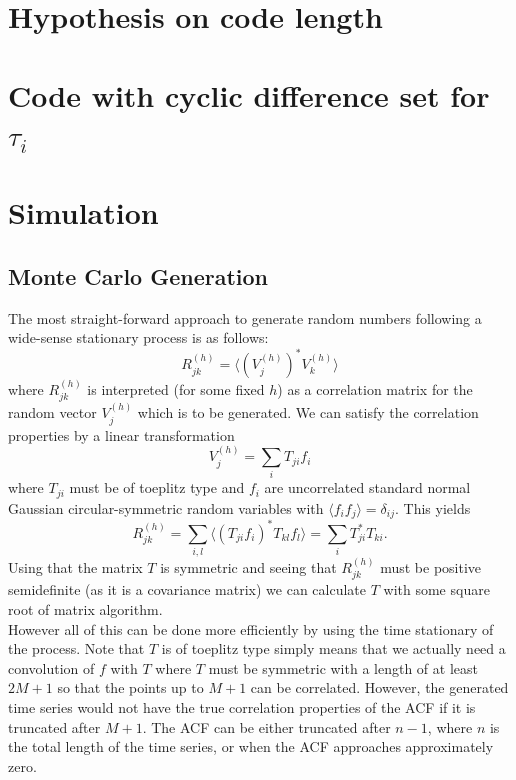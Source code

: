 \documentclass[18pt,a4paper]{extarticle}
\begin{document}
\section{Hypothesis on code length}
\section{Code with cyclic difference set for $\tau_i$}
\section{Simulation}
\subsection{Monte Carlo Generation}
The most straight-forward approach to generate random numbers following a wide-sense stationary process is as follows:
\begin{equation}
R^{(h)}_{jk} = \langle (V_{j}^{(h)})^* V_k^{(h)} \rangle
\end{equation}
where $R^{(h)}_{jk}$ is interpreted (for some fixed $h$) as a correlation matrix for the random vector $V_{j}^{(h)}$ which is to be generated.
We can satisfy the correlation properties by a linear transformation
\begin{equation}
V_j^{(h)} = \sum_{i} T_{ji}f_i
\end{equation}
where $T_{ji}$ must be of toeplitz type and $f_i$ are uncorrelated standard normal Gaussian circular-symmetric random variables with $\langle f_i f_j \rangle = \delta_{ij}$.
This yields
\begin{equation}
R^{(h)}_{jk} = \sum_{i,l} \langle (T_{ji}f_i)^* T_{kl}f_l \rangle = \sum_{i} T_{ji}^* T_{ki}.
\end{equation}
Using that the matrix $T$ is symmetric and seeing that $R^{(h)}_{jk}$ must be positive semidefinite (as it is a covariance matrix) we can calculate $T$ with some square root of matrix algorithm.\\
However all of this can be done more efficiently by using the time stationary of the process.
Note that $T$ is of toeplitz type simply means that we actually need a convolution of $f$ with $T$ where $T$ must be symmetric with a length of at least $2M + 1$ so that the points up to $M + 1$ can be correlated.
However, the generated time series would not have the true correlation properties of the ACF if it is truncated after $M+1$.
The ACF can be either truncated after $n-1$, where $n$ is the total length of the time series, or when the ACF approaches approximately zero.
\end{document}
